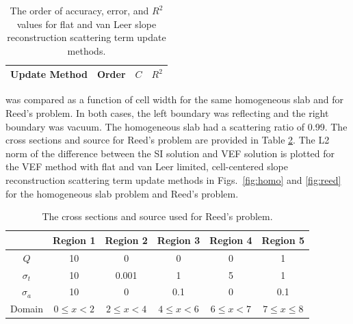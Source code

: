 	\begin{table} \centering
	\begin{tabular}{|c|c|c|c|}
	\hline
	\hline
	Update Method & Order & $C$ & $R^2$ \\ 
	\hline
		
	\hline
	\hline
	\end{tabular}
	\caption{The order of accuracy, error, and $R^2$ values for flat and van Leer slope reconstruction scattering term update methods. }
	\label{tab:mms}
	\end{table}

 was compared as a function of cell width for the same homogeneous slab and for Reed's problem.  In both cases, the left boundary was reflecting and the right boundary was vacuum. The homogeneous slab had a scattering ratio of 0.99. The cross sections and source for Reed's problem are provided in Table \ref{tab:reedXS}. The L2 norm of the difference between the SI solution and VEF solution is plotted for the VEF method with flat and van Leer limited, cell-centered slope reconstruction scattering term update methods in Figs.~\ref{fig:homo} and \ref{fig:reed} for the homogeneous slab problem and Reed's problem. 

	\begin{table} \centering
		\begin{tabular}{|c|c|c|c|c|c|}
			\hline
			& Region 1 & Region 2 & Region 3 & Region 4 & Region 5 \\ 
			\hline 
			$Q$ & 10 & 0 & 0 & 0 & 1 \\ 
			$\sigma_t$ & 10 & 0.001 & 1 & 5 & 1 \\ 
			$\sigma_a$ & 10 & 0 & 0.1 & 0 & 0.1 \\ 
			\hline 
			Domain & $0 \leq x < 2$ & $2 \leq x < 4$ & $4\leq x < 6$ &
				$6 \leq x < 7$ & $7 \leq x \leq 8$\\ 
			\hline 
		\end{tabular}
		\caption{The cross sections and source used for Reed's problem.}
		\label{tab:reedXS}
	\end{table}

